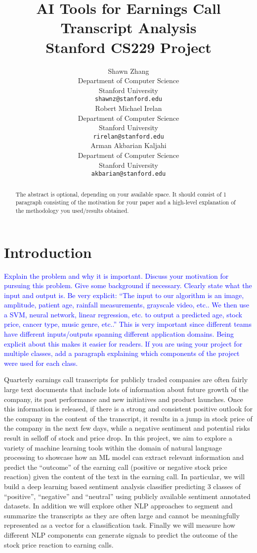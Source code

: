 \documentclass{article}
\title{
  AI Tools for Earnings Call Transcript Analysis \\
  \vspace{1em}
  \small{\normalfont Stanford CS229 Project}  %
}
\author{
  Shawn Zhang  \\
  Department of Computer Science \\
  Stanford University \\
  \texttt{shawnz@stanford.edu} \\
   \And
  Robert Michael Irelan \\
  Department of Computer Science \\
  Stanford University \\
  \texttt{rirelan@stanford.edu} \\
   \And
Arman Akbarian Kaljahi  \\
  Department of Computer Science \\
  Stanford University \\
  \texttt{akbarian@stanford.edu} \\
}
\newcommand{\note}[1]{\textcolor{blue}{{#1}}}
\begin{document}
\maketitle

\begin{abstract}
The abstract is optional, depending on your available space. It should consist of 1 paragraph consisting of the motivation for your paper and a high-level explanation of the methodology you used/results obtained.
\end{abstract}



\section{Introduction}
\note{%
Explain the problem and why it is important. Discuss your motivation for pursuing this problem. Give some background if necessary. Clearly state what the input and output is. Be very explicit: “The input to our algorithm is an {image, amplitude, patient age, rainfall measurements, grayscale video, etc.}. We then use a {SVM, neural network, linear regression, etc.} to output a predicted {age, stock price, cancer type, music genre, etc.}.” This is very important since different teams have different inputs/outputs spanning different application domains. Being explicit about this makes it easier for readers. If you are using your project for multiple classes, add a paragraph explaining which components of the project were used for each class.}

Quarterly earnings call transcripts for publicly traded companies are often fairly large text documents that include lots of information about future growth of the company, its past performance and new initiatives and product launches. Once this information is released, if there is a strong and consistent positive outlook for the company in the content of the transcript, it results in a jump in stock price of the company in the next few days, while a negative sentiment and potential risks result in selloff of stock and price drop. In this project, we aim to explore a variety of machine learning tools within the domain of natural language processing to showcase how an ML model can extract relevant information and predict the “outcome” of the earning call (positive or negative stock price reaction) given the content of the text in the earning call. In particular, we will build a deep learning based sentiment analysis classifier predicting 3 classes of “positive”, “negative” and “neutral” using publicly available sentiment annotated datasets. In addition we will explore other NLP approaches to segment and summarize the transcripts as they are often large and cannot be meaningfully represented as a vector for a classification task. Finally we will measure how different NLP components can generate signals to predict the outcome of the stock price reaction to earning calls. 
\end{document}
